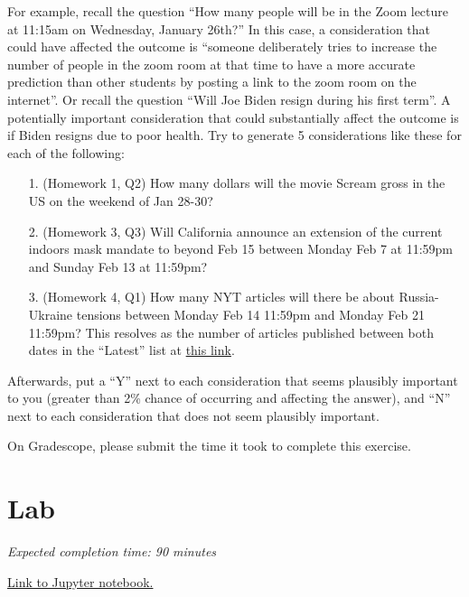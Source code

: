 \documentclass[11pt]{article}
\begin{document}
For example, recall the question ``How many people will be in the Zoom lecture at 11:15am on Wednesday, January 26th?'' In this case, a consideration that could have affected the outcome is ``someone deliberately tries to increase the number of people in the zoom room at that time to have a more accurate prediction than other students by posting a link to the zoom room on the internet''. Or recall the question ``Will Joe Biden resign during his first term''. A potentially important consideration that could substantially affect the outcome is if Biden resigns due to poor health. Try to generate 5 considerations like these for each of the following:

\begin{enumerate}
	\item[1.] (Homework 1, Q2) How many dollars will the movie Scream gross in the US on the weekend of Jan 28-30?

	\item[2.] (Homework 3, Q3) Will California announce an extension of the current indoors mask mandate to beyond Feb 15 between Monday Feb 7 at 11:59pm and Sunday Feb 13 at 11:59pm?

	\item[3.] (Homework 4, Q1) How many NYT articles will there be about Russia-Ukraine tensions between Monday Feb 14 11:59pm and Monday Feb 21 11:59pm? This resolves as the number of articles published between both dates in the ``Latest'' list at \href{https://www.nytimes.com/news-event/ukraine-russia?name=styln-russia-ukraine&region=TOP_BANNER&block=storyline_menu_recirc&action=click&pgtype=LegacyCollection&variant=0_Control}{this link}.
\end{enumerate}

Afterwards, put a ``Y'' next to each consideration that seems plausibly important to you (greater than 2\% chance of occurring and affecting the answer), 
and ``N'' next to each consideration that does not seem plausibly important.

On Gradescope, please submit the time it took to complete this exercise.

\section*{Lab}

\emph{Expected completion time: 90 minutes}

\href{https://datahub.berkeley.edu/hub/user-redirect/git-pull?repo=https%3A%2F%2Fgithub.com%2[…]stat-157-260-website%2Fhw%2Fhw4%2Fhw4lab.ipynb&branch=main}{Link to Jupyter notebook.}
\end{document}
